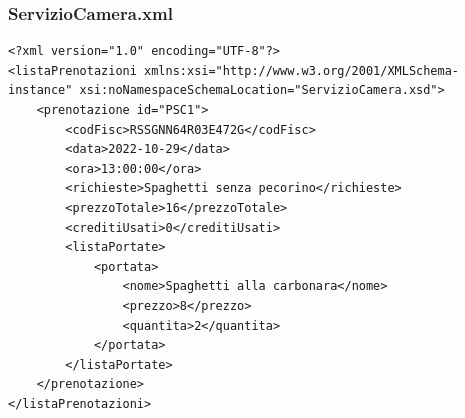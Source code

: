 \documentclass [a4paper, 12pt]{book}
\begin{document}
\subsubsection{ServizioCamera.xml}
\begin{lstlisting}[style=XML]
<?xml version="1.0" encoding="UTF-8"?>
<listaPrenotazioni xmlns:xsi="http://www.w3.org/2001/XMLSchema-instance" xsi:noNamespaceSchemaLocation="ServizioCamera.xsd">
    <prenotazione id="PSC1">
        <codFisc>RSSGNN64R03E472G</codFisc>
        <data>2022-10-29</data>
        <ora>13:00:00</ora>
        <richieste>Spaghetti senza pecorino</richieste>
        <prezzoTotale>16</prezzoTotale>
        <creditiUsati>0</creditiUsati>
        <listaPortate>
            <portata>
                <nome>Spaghetti alla carbonara</nome>
                <prezzo>8</prezzo>
                <quantita>2</quantita>
            </portata>
        </listaPortate>
    </prenotazione>
</listaPrenotazioni>
\end{lstlisting}
\end{document}
